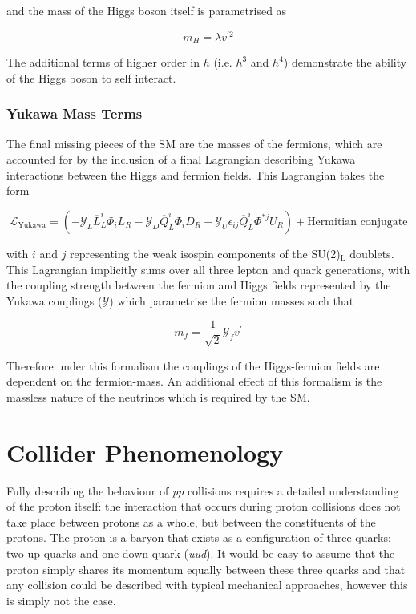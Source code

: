 \documentclass[12pt,a4paper,epsf,portrait,times,epsfig]{report}
\begin{document}
	and the mass of the Higgs boson itself is parametrised as 

	\begin{equation}
		m_{H} = \lambda v^{\prime 2}
	\end{equation}

	The additional terms of higher order in $h$ (i.e. $h^{3}$ and $h^{4}$) demonstrate the ability of the Higgs boson to self interact. 

	\subsubsection{Yukawa Mass Terms}

	The final missing pieces of the SM are the masses of the fermions, which are accounted for by the inclusion of a final Lagrangian describing Yukawa interactions between the Higgs and fermion fields. This Lagrangian takes the form

	\begin{equation}
		\mathcal{L}_{\mathrm{Yukawa}} = (-\mathcal{Y}_{L}\overline{L}^{i}_{L}\Phi_{i}L_{R}-\mathcal{Y}_{D}\overline{Q}^{i}_{L}\Phi_{i}D_{R}-\mathcal{Y}_{U}\epsilon_{ij}\overline{Q}^{i}_{L}\Phi^{*j}U_{R}) + \text{Hermitian conjugate}
	\end{equation}

	with $i$ and $j$ representing the weak isospin components of the SU(2)$_{\mathrm{L}}$ doublets. This Lagrangian implicitly sums over all three lepton and quark generations, with the coupling strength between the fermion and Higgs fields represented by the Yukawa couplings ($\mathcal{Y}$) which parametrise the fermion masses such that

	\begin{equation}
		m_{f} = \frac{1}{\sqrt{2}}\mathcal{Y}_{f}v^{\prime}
	\end{equation}

	Therefore under this formalism the couplings of the Higgs-fermion fields are dependent on the fermion-mass. An additional effect of this formalism is the massless nature of the neutrinos which is required by the SM.


	\section{Collider Phenomenology}
	
	Fully describing the behaviour of \textit{pp} collisions requires a detailed understanding of the proton itself: the interaction that occurs during proton collisions does not take place between protons as a whole, but between the constituents of the protons. The proton is a baryon that exists as a configuration of three quarks: two up quarks and one down quark (\textit{uud}). It would be easy to assume that the proton simply shares its momentum equally between these three quarks and that any collision could be described with typical mechanical approaches, however this is simply not the case. \par
\end{document}

